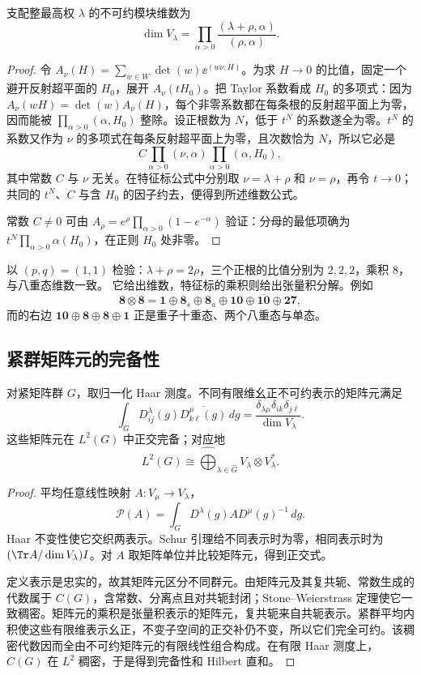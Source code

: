 \begin{corollary}
支配整最高权 $\lambda$ 的不可约模块维数为
\begin{equation}
\dim V_\lambda=
\prod_{\alpha>0}
\frac{(\lambda+\rho,\alpha)}{(\rho,\alpha)}.
\label{eq:weyl-dimension}
\end{equation}
\end{corollary}
\begin{proof}
令 $A_\nu(H)=\sum_{w\in W}\det(w)\ee^{(w\nu,H)}$。为求 $H\to0$ 的比值，固定一个避开反射超平面的 $H_0$，展开 $A_\nu(tH_0)$。把 Taylor 系数看成 $H_0$ 的多项式：因为 $A_\nu(wH)=\det(w)A_\nu(H)$，每个非零系数都在每条根的反射超平面上为零，因而能被 $\prod_{\alpha>0}(\alpha,H_0)$ 整除。设正根数为 $N$，低于 $t^N$ 的系数遂全为零。$t^N$ 的系数又作为 $\nu$ 的多项式在每条反射超平面上为零，且次数恰为 $N$，所以它必是
\[
C\prod_{\alpha>0}(\nu,\alpha)
  \prod_{\alpha>0}(\alpha,H_0),
\]
其中常数 $C$ 与 $\nu$ 无关。在特征标公式中分别取 $\nu=\lambda+\rho$ 和 $\nu=\rho$，再令 $t\to0$；共同的 $t^N$、$C$ 与含 $H_0$ 的因子约去，便得到所述维数公式。

常数 $C\ne0$ 可由 $A_\rho=e^\rho\prod_{\alpha>0}(1-e^{-\alpha})$ 验证：分母的最低项确为 $t^N\prod_{\alpha>0}\alpha(H_0)$，在正则 $H_0$ 处非零。

\end{proof}
以 $(p,q)=(1,1)$ 检验：$\lambda+\rho=2\rho$，三个正根的比值分别为 $2,2,2$，乘积 $8$，与八重态维数一致。
它给出维数，特征标的乘积则给出张量积分解。例如
\[
\mathbf8\otimes\mathbf8
=\mathbf1\oplus\mathbf8_s\oplus\mathbf8_a
\oplus\mathbf{10}\oplus\overline{\mathbf{10}}\oplus\mathbf{27},
\]
而的右边 $\mathbf{10}\oplus\mathbf8\oplus\mathbf8\oplus\mathbf1$ 正是重子十重态、两个八重态与单态。

\subsection{紧群矩阵元的完备性}

\begin{theorem}
对紧矩阵群 $G$，取归一化 Haar 测度。不同有限维幺正不可约表示的矩阵元满足
\[
 \int_G D^\lambda_{ij}(g)\overline{D^\mu_{k\ell}(g)}\,dg
 =\frac{\delta_{\lambda\mu}\delta_{ik}\delta_{j\ell}}{\dim V_\lambda}.
\]
这些矩阵元在 $L^2(G)$ 中正交完备；对应地
\[
 L^2(G)\cong\widehat{\bigoplus}_{\lambda\in\widehat G}V_\lambda\otimes V_\lambda^*.
\]
\end{theorem}
\begin{proof}
平均任意线性映射 $A:V_\mu\to V_\lambda$，
\[
 \mathcal P(A)=\int_G D^\lambda(g)A D^\mu(g)^{-1}\,dg.
\]
Haar 不变性使它交织两表示。Schur 引理给不同表示时为零，相同表示时为 $(\Tr A/\dim V_\lambda)I$。对 $A$ 取矩阵单位并比较矩阵元，得到正交式。

定义表示是忠实的，故其矩阵元区分不同群元。由矩阵元及其复共轭、常数生成的代数属于 $C(G)$，含常数、分离点且对共轭封闭；Stone--Weierstrass 定理使它一致稠密。矩阵元的乘积是张量积表示的矩阵元，复共轭来自共轭表示。紧群平均内积使这些有限维表示幺正，不变子空间的正交补仍不变，所以它们完全可约。该稠密代数因而全由不可约矩阵元的有限线性组合构成。在有限 Haar 测度上，$C(G)$ 在 $L^2$ 稠密，于是得到完备性和 Hilbert 直和。
\end{proof}

